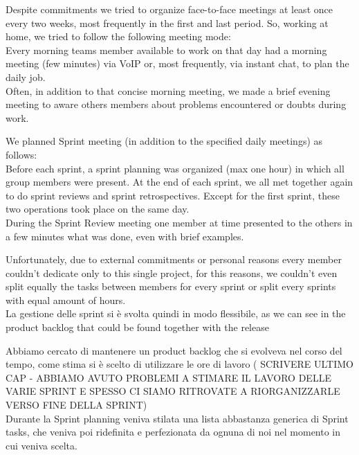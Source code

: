 \documentclass[a4paper,12pt]{report}
\begin{document}
Despite commitments we tried to organize face-to-face meetings at least once every two weeks, most frequently in the first and last period. So, working at home, we tried to follow the following meeting mode: \\
Every morning teams member available to work on that day had a morning meeting (few minutes) via VoIP or, most frequently, via instant chat, to plan the daily job.\\
Often, in addition to that concise morning meeting, we made a brief evening meeting to aware others members about problems encountered or doubts during work.

We planned Sprint meeting (in addition to the specified daily meetings) as follows:\\
Before each sprint, a sprint planning was organized (max one hour) in which all group members were present. At the end of each sprint, we all met together again to do sprint reviews and sprint retrospectives. Except for the first sprint, these two operations took place on the same day.\\
During the Sprint Review meeting one member at time presented to the others in a few minutes what was done, even with brief examples.

Unfortunately, due to external commitments or personal reasons every member couldn't dedicate only to this single project, for this reasons, we couldn't even split equally the tasks between members for every sprint or split every sprints with equal amount of hours. \\ %
La gestione delle sprint si è svolta quindi in modo flessibile, as we can see in the product backlog that could be found together with the release %

Abbiamo cercato di mantenere un product backlog che si evolveva nel corso del tempo, come stima si è scelto di utilizzare le ore di lavoro ( %
SCRIVERE ULTIMO CAP - ABBIAMO AVUTO PROBLEMI A STIMARE IL LAVORO DELLE VARIE SPRINT E SPESSO CI SIAMO RITROVATE A RIORGANIZZARLE VERSO FINE DELLA SPRINT)\\
Durante la Sprint planning veniva stilata una lista abbastanza generica di Sprint tasks, che veniva poi ridefinita e perfezionata da ognuna di noi nel momento in cui veniva scelta. 


\end{document}
